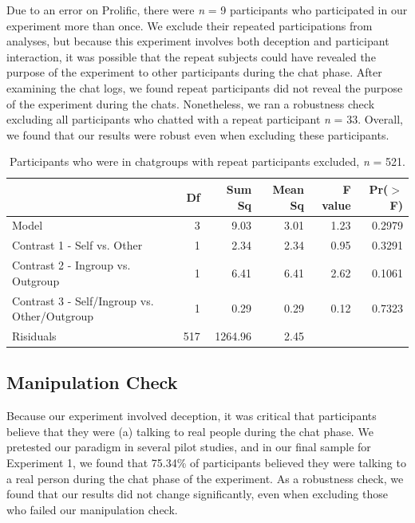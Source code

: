 \documentclass[12pt,]{article}
\begin{document}
Due to an error on Prolific, there were \emph{n} = 9 participants who participated in our experiment more than once. We exclude their repeated participations from analyses, but because this experiment involves both deception and participant interaction, it was possible that the repeat subjects could have revealed the purpose of the experiment to other participants during the chat phase. After examining the chat logs, we found repeat participants did not reveal the purpose of the experiment during the chats. Nonetheless, we ran a robustness check excluding all participants who chatted with a repeat participant \emph{n} = 33. Overall, we found that our results were robust even when excluding these participants.  

\begin{table}[ht]
\centering
\begin{tabular}{lrrrrr}
  \hline
 & Df & Sum Sq & Mean Sq & F value & Pr($>$F) \\ 
  \hline
Model & 3 & 9.03 & 3.01 & 1.23 & 0.2979 \\ 
  Contrast 1 - Self vs. Other & 1 & 2.34 & 2.34 & 0.95 & 0.3291 \\ 
  Contrast 2 - Ingroup vs. Outgroup & 1 & 6.41 & 6.41 & 2.62 & 0.1061 \\ 
  Contrast 3 - Self/Ingroup vs. Other/Outgroup & 1 & 0.29 & 0.29 & 0.12 & 0.7323 \\ 
  Risiduals & 517 & 1264.96 & 2.45 &  &  \\ 
   \hline
\end{tabular}
\caption{Participants who were in chatgroups with repeat participants excluded, \emph{n} = 521.} 
\label{repeats_s1}
\end{table}


\newpage
\subsection{Manipulation Check}
\label{appendix:manip1}

Because our experiment involved deception, it was critical that participants believe that they were (a) talking to real people during the chat phase. We pretested our paradigm in several pilot studies, and in our final sample for Experiment 1, we found that  75.34\% of participants believed they were talking to a real person during the chat phase of the experiment. As a robustness check, we found that our results did not change significantly, even when excluding those who failed our manipulation check. 
\end{document}
